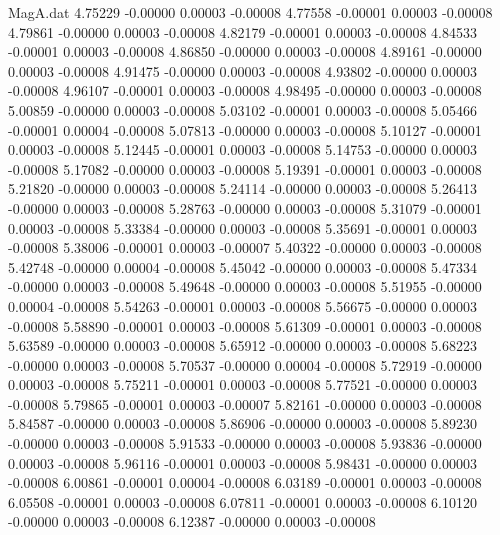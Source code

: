 \begin{filecontents}{MagA.dat}
   4.75229   -0.00000    0.00003   -0.00008
   4.77558   -0.00001    0.00003   -0.00008
   4.79861   -0.00000    0.00003   -0.00008
   4.82179   -0.00001    0.00003   -0.00008
   4.84533   -0.00001    0.00003   -0.00008
   4.86850   -0.00000    0.00003   -0.00008
   4.89161   -0.00000    0.00003   -0.00008
   4.91475   -0.00000    0.00003   -0.00008
   4.93802   -0.00000    0.00003   -0.00008
   4.96107   -0.00001    0.00003   -0.00008
   4.98495   -0.00000    0.00003   -0.00008
   5.00859   -0.00000    0.00003   -0.00008
   5.03102   -0.00001    0.00003   -0.00008
   5.05466   -0.00001    0.00004   -0.00008
   5.07813   -0.00000    0.00003   -0.00008
   5.10127   -0.00001    0.00003   -0.00008
   5.12445   -0.00001    0.00003   -0.00008
   5.14753   -0.00000    0.00003   -0.00008
   5.17082   -0.00000    0.00003   -0.00008
   5.19391   -0.00001    0.00003   -0.00008
   5.21820   -0.00000    0.00003   -0.00008
   5.24114   -0.00000    0.00003   -0.00008
   5.26413   -0.00000    0.00003   -0.00008
   5.28763   -0.00000    0.00003   -0.00008
   5.31079   -0.00001    0.00003   -0.00008
   5.33384   -0.00000    0.00003   -0.00008
   5.35691   -0.00001    0.00003   -0.00008
   5.38006   -0.00001    0.00003   -0.00007
   5.40322   -0.00000    0.00003   -0.00008
   5.42748   -0.00000    0.00004   -0.00008
   5.45042   -0.00000    0.00003   -0.00008
   5.47334   -0.00000    0.00003   -0.00008
   5.49648   -0.00000    0.00003   -0.00008
   5.51955   -0.00000    0.00004   -0.00008
   5.54263   -0.00001    0.00003   -0.00008
   5.56675   -0.00000    0.00003   -0.00008
   5.58890   -0.00001    0.00003   -0.00008
   5.61309   -0.00001    0.00003   -0.00008
   5.63589   -0.00000    0.00003   -0.00008
   5.65912   -0.00000    0.00003   -0.00008
   5.68223   -0.00000    0.00003   -0.00008
   5.70537   -0.00000    0.00004   -0.00008
   5.72919   -0.00000    0.00003   -0.00008
   5.75211   -0.00001    0.00003   -0.00008
   5.77521   -0.00000    0.00003   -0.00008
   5.79865   -0.00001    0.00003   -0.00007
   5.82161   -0.00000    0.00003   -0.00008
   5.84587   -0.00000    0.00003   -0.00008
   5.86906   -0.00000    0.00003   -0.00008
   5.89230   -0.00000    0.00003   -0.00008
   5.91533   -0.00000    0.00003   -0.00008
   5.93836   -0.00000    0.00003   -0.00008
   5.96116   -0.00001    0.00003   -0.00008
   5.98431   -0.00000    0.00003   -0.00008
   6.00861   -0.00001    0.00004   -0.00008
   6.03189   -0.00001    0.00003   -0.00008
   6.05508   -0.00001    0.00003   -0.00008
   6.07811   -0.00001    0.00003   -0.00008
   6.10120   -0.00000    0.00003   -0.00008
   6.12387   -0.00000    0.00003   -0.00008

\end{filecontents}
